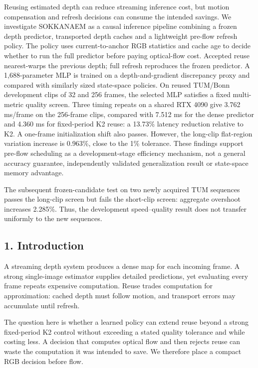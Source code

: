 \documentclass[
  10pt,
]{article}
\begin{document}
Reusing estimated depth can reduce streaming inference cost, but motion
compensation and refresh decisions can consume the intended savings. We
investigate SOKKANAEM as a causal inference pipeline combining a frozen
depth predictor, transported depth caches and a lightweight pre-flow
refresh policy. The policy uses current-to-anchor RGB statistics and
cache age to decide whether to run the full predictor before paying
optical-flow cost. Accepted reuse nearest-warps the previous depth; full
refresh reproduces the frozen predictor. A 1,688-parameter MLP is
trained on a depth-and-gradient discrepancy proxy and compared with
similarly sized state-space policies. On reused TUM/Bonn development
clips of 32 and 256 frames, the selected MLP satisfies a fixed
multi-metric quality screen. Three timing repeats on a shared RTX 4090
give 3.762 ms/frame on the 256-frame clips, compared with 7.512 ms for
the dense predictor and 4.360 ms for fixed-period K2 reuse: a 13.73\%
latency reduction relative to K2. A one-frame initialization shift also
passes. However, the long-clip flat-region variation increase is
0.963\%, close to the 1\% tolerance. These findings support pre-flow
scheduling as a development-stage efficiency mechanism, not a general
accuracy guarantee, independently validated generalization result or
state-space memory advantage.

The subsequent frozen-candidate test on two newly acquired TUM sequences
passes the long-clip screen but fails the short-clip screen: aggregate
overshoot increases 2.285\%. Thus, the development speed--quality result
does not transfer uniformly to the new sequences.

\subsection{1. Introduction}\label{introduction}

A streaming depth system produces a dense map for each incoming frame. A
strong single-image estimator supplies detailed predictions, yet
evaluating every frame repeats expensive computation. Reuse trades
computation for approximation: cached depth must follow motion, and
transport errors may accumulate until refresh.

The question here is whether a learned policy can extend reuse beyond a
strong fixed-period K2 control without exceeding a stated quality
tolerance and while costing less. A decision that computes optical flow
and then rejects reuse can waste the computation it was intended to
save. We therefore place a compact RGB decision before flow.
\end{document}
